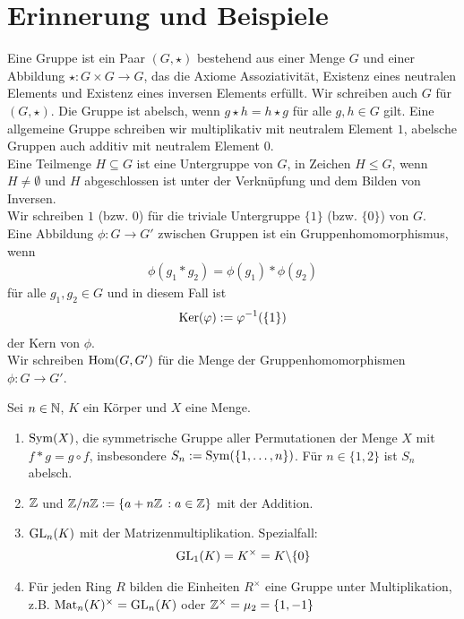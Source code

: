 \section{Erinnerung und Beispiele}

\begin{erinnerung}
	Eine Gruppe ist ein Paar $(G,\star)$ bestehend aus einer Menge $G$ und einer Abbildung $\star : G \times G \to G$, das die Axiome Assoziativität, Existenz eines neutralen Elements und Existenz eines inversen Elements erfüllt. Wir schreiben auch $G$ für $(G,\star)$. Die Gruppe ist abelsch, wenn $g \star h = h \star g$ für alle $g,h \in G$ gilt. Eine allgemeine Gruppe schreiben wir multiplikativ mit neutralem Element $1$, abelsche Gruppen auch additiv mit neutralem Element $0$. \\
	Eine Teilmenge $H \subseteq G$ ist eine Untergruppe von $G$, in Zeichen $H \leq G$, wenn $H \neq \emptyset$ und $H$ abgeschlossen ist unter der Verknüpfung und dem Bilden von Inversen. \\
	Wir schreiben $1$ (bzw. $0$) für die triviale Untergruppe $\{1\}$ (bzw. $\{0\}$) von $G$. \\
	Eine Abbildung $\phi : G \to G'$ zwischen Gruppen ist ein Gruppenhomomorphismus, wenn
	\begin{align*}
		\phi(g_1 * g_2) = \phi(g_1) * \phi(g_2)
	\end{align*}
	für alle $g_1,g_2 \in G$ und in diesem Fall ist
	\begin{align*}
		\operatorname{Ker} (\varphi) := \varphi^{-1}(\{1\})
	\end{align*}
	der Kern von $\phi$. \\
	Wir schreiben $\operatorname{Hom}(G,G')$ für die Menge der Gruppenhomomorphismen $\phi: G \to G'$.
\end{erinnerung}

\begin{bsp}
	Sei $n \in \mathbb{N}$, $K$ ein Körper und $X$ eine Menge.
	\begin{enumerate}
		\item $\operatorname{Sym}(X)$, die symmetrische Gruppe aller Permutationen der Menge $X$ mit $f*g = g \circ f$, insbesondere $S_n:=\operatorname{Sym}(\{1, \dots, n\})$. Für $n \in \{1,2\}$ ist $S_n$ abelsch.
		\item $\mathbb{Z}$ und $\mathbb{Z} / n \mathbb{Z}:=\{ a + n\mathbb{Z} \, : a \in \mathbb{Z} \}$ mit der Addition.
		\item $\operatorname{GL}_n(K)$ mit der Matrizenmultiplikation. Spezialfall:
			\begin{align*}
				\operatorname{GL}_1(K) = K^{\times} = K \backslash \{0\}
			\end{align*}
		\item Für jeden Ring $R$ bilden die Einheiten $R^{\times}$ eine Gruppe unter Multiplikation, \\
		z.B. $\operatorname{Mat}_n(K)^{\times} = \operatorname{GL}_n(K)$ oder $\mathbb{Z}^{\times} = \mu_2=\{1,-1\}$
	\end{enumerate}
\end{bsp}

